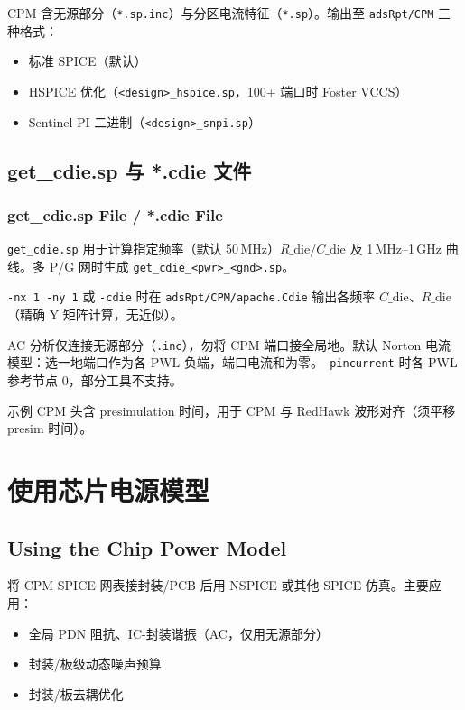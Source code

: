 CPM 含无源部分（\texttt{*.sp.inc}）与分区电流特征（\texttt{*.sp}）。输出至 \texttt{adsRpt/CPM} 三种格式：
\begin{itemize}
  \item 标准 SPICE（默认）
  \item HSPICE 优化（\texttt{<design>\_hspice.sp}，100+ 端口时 Foster VCCS）
  \item Sentinel-PI 二进制（\texttt{<design>\_snpi.sp}）
\end{itemize}


\subsection{get\_cdie.sp 与 *.cdie 文件}
\subsubsection*{get\_cdie.sp File / *.cdie File}

\texttt{get\_cdie.sp} 用于计算指定频率（默认 50\,MHz）$R\_{\mathrm{die}}/C\_{\mathrm{die}}$ 及 1\,MHz--1\,GHz 曲线。多 P/G 网时生成 \texttt{get\_cdie\_<pwr>\_<gnd>.sp}。

\texttt{-nx 1 -ny 1} 或 \texttt{-cdie} 时在 \texttt{adsRpt/CPM/apache.Cdie} 输出各频率 $C\_{\mathrm{die}}$、$R\_{\mathrm{die}}$（精确 Y 矩阵计算，无近似）。

\begin{noteBox}
AC 分析仅连接无源部分（\texttt{.inc}），勿将 CPM 端口接全局地。默认 Norton 电流模型：选一地端口作为各 PWL 负端，端口电流和为零。\texttt{-pincurrent} 时各 PWL 参考节点 0，部分工具不支持。
\end{noteBox}


示例 CPM 头含 presimulation 时间，用于 CPM 与 RedHawk 波形对齐（须平移 presim 时间）。

\section{使用芯片电源模型}
\subsection*{Using the Chip Power Model}

将 CPM SPICE 网表接封装/PCB 后用 NSPICE 或其他 SPICE 仿真。主要应用：
\begin{itemize}
  \item 全局 PDN 阻抗、IC-封装谐振（AC，仅用无源部分）
  \item 封装/板级动态噪声预算
  \item 封装/板去耦优化
\end{itemize}

